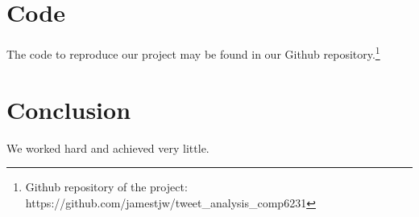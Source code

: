 \documentclass[a4paper,12pt]{article}
\begin{document}
\section{Code}
The code to reproduce our project may be found in our Github repository.\footnote{Github repository of the project: https://github.com/jamestjw/tweet\_analysis\_comp6231} 

\section{Conclusion}
We worked hard and achieved very little.

\nocite{*}



\end{document}
